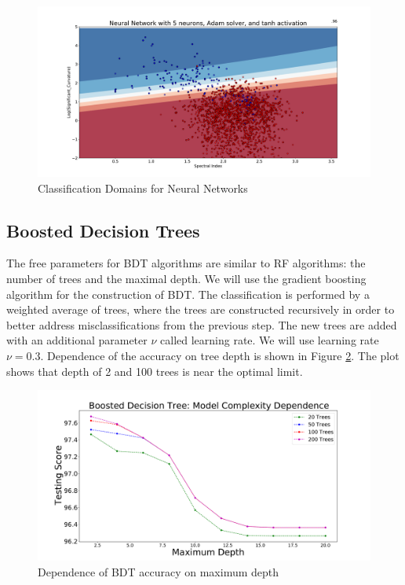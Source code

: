 \begin{figure}[h]
\includegraphics[width=\twopicsp\textwidth]{plots/classdom_nn_200_adam_tanh_5.pdf}
\caption{Classification Domains for Neural Networks}
\label{fig:NN_domains}
\end{figure}

\subsection{Boosted Decision Trees}

The free parameters for BDT algorithms are similar to RF algorithms: the number of trees and the maximal depth.
We will use the gradient boosting algorithm for the construction of BDT.
The classification is performed by a weighted average of trees, where the trees are constructed recursively in order to better address 
misclassifications from the previous step. The new trees are added with an additional parameter $\nu$ called learning rate.
We will use learning rate $\nu = 0.3$.
Dependence of the accuracy on tree depth is shown in Figure \ref{fig:BDT_depth}. The plot shows that depth of 2 and 100 trees is near the optimal limit. 

\begin{figure}[h]
\includegraphics[width=\twopicsp\textwidth]{plots/bdt_assoc_depth.pdf}
\caption{Dependence of BDT accuracy on maximum depth}
\label{fig:BDT_depth}
\end{figure}

